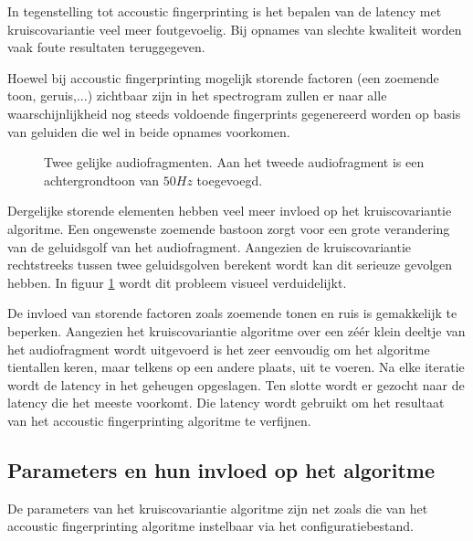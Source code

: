 In tegenstelling tot accoustic fingerprinting is het bepalen van de latency met kruiscovariantie veel meer foutgevoelig. Bij opnames van slechte kwaliteit worden vaak foute resultaten teruggegeven. 

Hoewel bij accoustic fingerprinting mogelijk storende factoren (een zoemende toon, geruis,...) zichtbaar zijn in het spectrogram zullen er naar alle waarschijnlijkheid nog steeds voldoende fingerprints gegenereerd worden op basis van geluiden die wel in beide opnames voorkomen. 

\begin{figure}[h!]
	\captionsetup{width=0.7\textwidth}
	\caption[Zoemtoon van $50 Hz$]{Twee gelijke audiofragmenten. Aan het tweede audiofragment is een achtergrondtoon van $50 Hz$ toegevoegd.}
	\begin{center}
		\advance\parskip0.3cm
		
	\end{center}
	\label{zoemtoon}
\end{figure}

Dergelijke storende elementen hebben veel meer invloed op het kruiscovariantie algoritme. Een ongewenste zoemende bastoon zorgt voor een grote verandering van de geluidsgolf van het audiofragment. Aangezien de kruiscovariantie rechtstreeks tussen twee geluidsgolven berekent wordt kan dit serieuze gevolgen hebben. In figuur \ref{zoemtoon} wordt dit probleem visueel verduidelijkt.

De invloed van storende factoren zoals zoemende tonen en ruis is gemakkelijk te beperken. Aangezien het kruiscovariantie algoritme over een zéér klein deeltje van het audiofragment wordt uitgevoerd is het zeer eenvoudig om het algoritme tientallen keren, maar telkens op een andere plaats, uit te voeren. Na elke iteratie wordt de latency in het geheugen opgeslagen. Ten slotte wordt er gezocht naar de latency die het meeste voorkomt. Die latency wordt gebruikt om het resultaat van het accoustic fingerprinting algoritme te verfijnen.

\subsection{Parameters en hun invloed op het algoritme}

De parameters van het kruiscovariantie algoritme zijn net zoals die van het accoustic fingerprinting algoritme instelbaar via het configuratiebestand.

